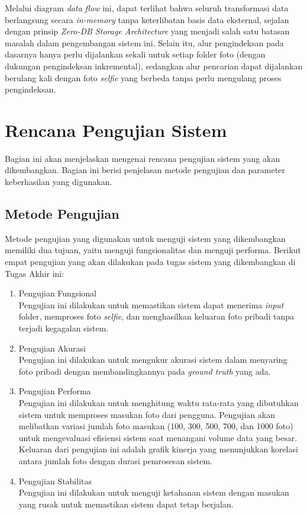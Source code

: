 Melalui diagram \textit{data flow} ini, dapat terlihat bahwa seluruh
transformasi data berlangsung secara \textit{in-memory} tanpa keterlibatan
basis data eksternal, sejalan dengan prinsip \textit{Zero-DB Storage
Architecture} yang menjadi salah satu batasan masalah dalam pengembangan
sistem ini. Selain itu, alur pengindeksan pada dasarnya hanya perlu dijalankan
sekali untuk setiap folder foto (dengan dukungan pengindeksan inkremental),
sedangkan alur pencarian dapat dijalankan berulang kali dengan foto
\textit{selfie} yang berbeda tanpa perlu mengulang proses pengindeksan.

\section{Rencana Pengujian Sistem}

Bagian ini akan menjelaskan mengenai rencana pengujian sistem yang akan dikembangkan. Bagian ini berisi penjelasan metode pengujian dan parameter keberhasilan yang digunakan.

\subsection{Metode Pengujian}

Metode pengujian yang digunakan untuk menguji sistem yang dikembangkan memiliki dua tujuan, yaitu menguji fungsionalitas dan menguji performa. Berikut empat pengujian yang akan dilakukan pada tugas sistem yang dikembangkan di Tugas Akhir ini:

\begin{enumerate}
    \item Pengujian Fungsional \\
    Pengujian ini dilakukan untuk memastikan sistem dapat menerima \textit{input} folder, memproses foto \textit{selfie}, dan menghasilkan keluaran foto pribadi tanpa terjadi kegagalan sistem.
    \item Pengujian Akurasi \\
    Pengujian ini dilakukan untuk mengukur akurasi sistem dalam menyaring foto pribadi dengan membandingkannya pada \textit{ground truth} yang ada.
    \item Pengujian Performa \\
    Pengujian ini dilakukan untuk menghitung waktu rata-rata yang dibutuhkan sistem untuk memproses masukan foto dari pengguna. Pengujian akan melibatkan variasi jumlah foto masukan (100, 300, 500, 700, dan 1000 foto) untuk mengevaluasi efisiensi sistem saat menangani volume data yang besar. Keluaran dari pengujian ini adalah grafik kinerja yang menunjukkan korelasi antara jumlah foto dengan durasi pemrosesan sistem.
    \item Pengujian Stabilitas \\
    Pengujian ini dilakukan untuk menguji ketahanan sistem dengan masukan yang rusak untuk memastikan sistem dapat tetap berjalan. 
\end{enumerate}


